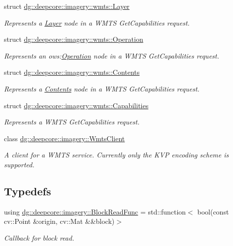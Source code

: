 \begin{DoxyCompactItemize}
struct \hyperlink{structdg_1_1deepcore_1_1imagery_1_1wmts_1_1_layer}{dg\+::deepcore\+::imagery\+::wmts\+::\+Layer}
\begin{DoxyCompactList}\small\item\em Represents a \hyperlink{structdg_1_1deepcore_1_1imagery_1_1wmts_1_1_layer}{Layer} node in a W\+M\+TS Get\+Capabilities request. \end{DoxyCompactList}\item 
struct \hyperlink{structdg_1_1deepcore_1_1imagery_1_1wmts_1_1_operation}{dg\+::deepcore\+::imagery\+::wmts\+::\+Operation}
\begin{DoxyCompactList}\small\item\em Represents an ows\+:\hyperlink{structdg_1_1deepcore_1_1imagery_1_1wmts_1_1_operation}{Operation} node in a W\+M\+TS Get\+Capabilities request. \end{DoxyCompactList}\item 
struct \hyperlink{structdg_1_1deepcore_1_1imagery_1_1wmts_1_1_contents}{dg\+::deepcore\+::imagery\+::wmts\+::\+Contents}
\begin{DoxyCompactList}\small\item\em Represents a \hyperlink{structdg_1_1deepcore_1_1imagery_1_1wmts_1_1_contents}{Contents} node in a W\+M\+TS Get\+Capabilities request. \end{DoxyCompactList}\item 
struct \hyperlink{structdg_1_1deepcore_1_1imagery_1_1wmts_1_1_capabilities}{dg\+::deepcore\+::imagery\+::wmts\+::\+Capabilities}
\begin{DoxyCompactList}\small\item\em Represents a W\+M\+TS Get\+Capabilities request. \end{DoxyCompactList}\item 
class \hyperlink{classdg_1_1deepcore_1_1imagery_1_1_wmts_client}{dg\+::deepcore\+::imagery\+::\+Wmts\+Client}
\begin{DoxyCompactList}\small\item\em A client for a W\+M\+TS service. Currently only the K\+VP encoding scheme is supported. \end{DoxyCompactList}\end{DoxyCompactItemize}
\subsection*{Typedefs}
\begin{DoxyCompactItemize}
\item 
using \hyperlink{group___imagery_module_ga2238c2ef34502f68956ddef1f477ad95}{dg\+::deepcore\+::imagery\+::\+Block\+Read\+Func} = std\+::function$<$ bool(const cv\+::\+Point \&origin, cv\+::\+Mat \&\&block)$>$
\begin{DoxyCompactList}\small\item\em Callback for block read. \end{DoxyCompactList}\end{DoxyCompactItemize}
